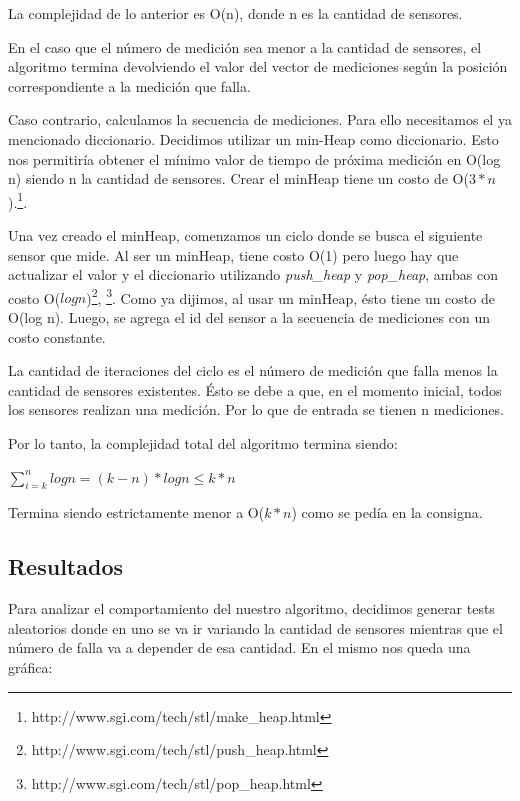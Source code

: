 \quad La complejidad de lo anterior es O(n), donde n es la cantidad de sensores.

\quad En el caso que el n\'umero de medici\'on sea menor a la cantidad de sensores, el algoritmo termina devolviendo el valor del vector de mediciones seg\'un la posici\'on correspondiente a la medici\'on que falla.

\quad Caso contrario, calculamos la secuencia de mediciones. Para ello necesitamos el ya mencionado diccionario. Decidimos utilizar un min-Heap como diccionario. Esto nos permitir\'ia obtener el m\'inimo valor de tiempo de pr\'oxima medici\'on en O(log n) siendo n la cantidad de sensores. Crear el minHeap tiene un costo de O($ 3*n $).\footnote{http://www.sgi.com/tech/stl/make\_heap.html}.

\quad Una vez creado el minHeap, comenzamos un ciclo donde se busca el siguiente sensor que mide. Al ser un minHeap, tiene costo O(1) pero luego hay que actualizar el valor y el diccionario utilizando \textit{push\_heap} y \textit{pop\_heap}, ambas con costo O($log n$)\footnote{http://www.sgi.com/tech/stl/push\_heap.html}, \footnote{http://www.sgi.com/tech/stl/pop\_heap.html}. Como ya dijimos, al usar un minHeap, \'esto tiene un costo de O(log n). Luego, se agrega el id del sensor a la secuencia de mediciones con un costo constante.

\quad La cantidad de iteraciones del ciclo es el n\'umero de medici\'on que falla menos la cantidad de sensores existentes. \'Esto se debe a que, en el momento inicial, todos los sensores realizan una medici\'on. Por lo que de entrada se tienen n mediciones.

\quad Por lo tanto, la complejidad total del algoritmo termina siendo:


\quad


$ \displaystyle\sum_{i = k}^{n} log n = (k - n) * log n \leq k * n$


\quad


\quad Termina siendo estrictamente menor a O($ k*n $) como se ped\'ia en la consigna.


\quad


\subsection{Resultados}

\quad Para analizar el comportamiento del nuestro algoritmo, decidimos generar tests aleatorios donde en uno se va ir variando la cantidad de sensores mientras que el n\'umero de falla va a depender de esa cantidad. En el mismo nos queda una gr\'afica:


